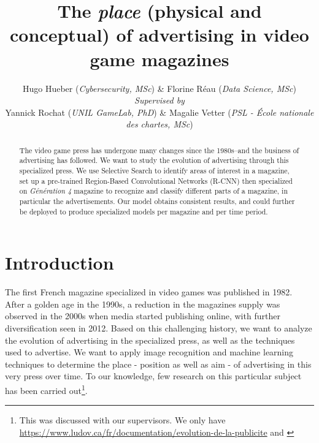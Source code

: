 \documentclass[10pt,conference,compsocconf]{IEEEtran}
\begin{document}
\title{The \textit{place} (physical and conceptual) of advertising in video game magazines}
\author{
  Hugo Hueber (\textit{Cybersecurity, MSc}) \& Florine Réau (\textit{Data Science, MSc})\\
  \textit{Supervised by}\\Yannick Rochat (\textit{UNIL GameLab, PhD}) \& Magalie Vetter (\textit{PSL - École nationale des chartes, MSc})
}

\maketitle

\begin{abstract}
  The video game press has undergone many changes since the 1980s–and the business of advertising has followed. We want to study the evolution of advertising through this specialized press. We use Selective Search to identify areas of interest in a magazine, set up a pre-trained Region-Based Convolutional Networks (R-CNN) then specialized on \textit{Génération 4} magazine to recognize and classify different parts of a magazine, in particular the advertisements. Our model obtains consistent results, and could further be deployed to produce specialized models per magazine and per time period.
\end{abstract}

\section{Introduction}
The first French magazine specialized in video games was published in 1982. After a golden age in the 1990s, a reduction in the magazines supply was observed in the 2000s when media started publishing online, with further diversification seen in 2012\cite{claireblandin2018}. Based on this challenging history, we want to analyze the evolution of advertising in the specialized press, as well as the techniques used to advertise. We want to apply image recognition and machine learning techniques to determine the place - position as well as aim - of advertising in this very press over time. To our knowledge, few research on this particular subject has been carried out\footnote{This was discussed with our supervisors. We only have \url{https://www.ludov.ca/fr/documentation/evolution-de-la-publicite} and \cite{kirkpatrick2015}}.
\end{document}
